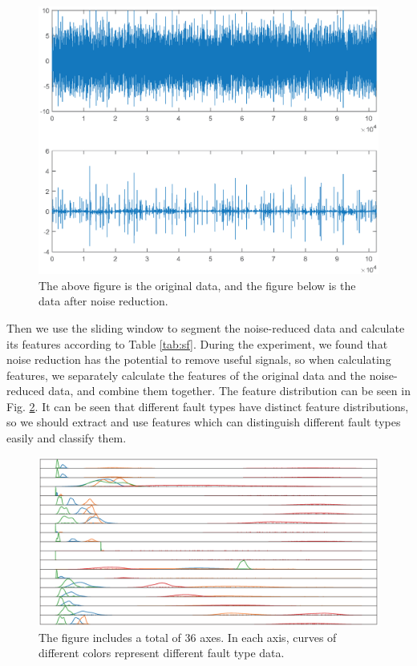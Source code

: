 \documentclass{bioinfo}
\begin{document}
\begin{figure}[htbp]
	\centering
	\includegraphics[width=\columnwidth]{pre.eps}
	\caption{The above figure is the original data, and the figure below is the data after noise reduction.}
	\label{fig:pre}
\end{figure}

Then we use the sliding window to segment the noise-reduced data and calculate its features according to Table \ref{tab:sf}. During the experiment, we found that noise reduction has the potential to remove useful signals, so when calculating features, we separately calculate the features of the original data and the noise-reduced data, and combine them together. The feature distribution can be seen in Fig. \ref{fig:feature}. It can be seen that different fault types have distinct feature distributions, so we should extract and use features which can distinguish different fault types easily and classify them.

\begin{figure}[htbp]
	\centering
	\includegraphics[width=\columnwidth]{feature.eps}
	\caption{The figure includes a total of 36 axes. In each axis, curves of different colors represent different fault type data.}
	\label{fig:feature}
\end{figure}
\end{document}

